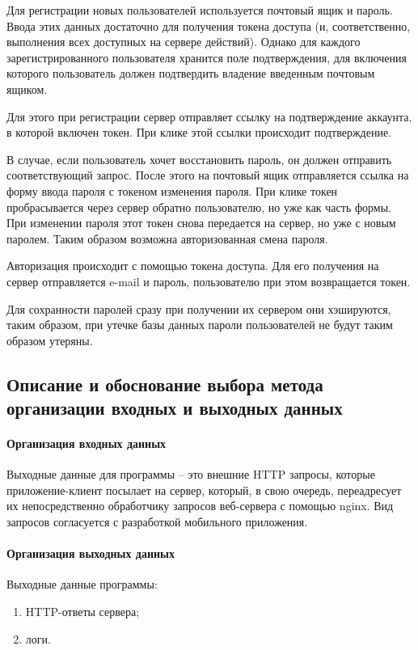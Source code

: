 \documentclass[explnote]{espd}
\begin{document}
Для регистрации новых пользователей используется почтовый ящик и пароль. Ввода этих данных достаточно для получения токена доступа (и, соответственно, выполнения всех доступных на сервере действий). Однако для каждого зарегистрированного пользователя хранится поле подтверждения, для включения которого пользователь должен подтвердить владение введенным почтовым ящиком.

Для этого при регистрации сервер отправляет ссылку на подтверждение аккаунта, в которой включен токен. При клике этой ссылки происходит подтверждение.

В случае, если пользователь хочет восстановить пароль, он должен отправить соответствующий запрос. После этого на почтовый ящик отправляется ссылка на форму ввода пароля с токеном изменения пароля. При клике токен пробрасывается через сервер обратно пользователю, но уже как часть формы. При изменении пароля этот токен снова передается на сервер, но уже с новым паролем. Таким образом возможна авторизованная смена пароля.

Авторизация происходит с помощью токена доступа. Для его получения на сервер отправляется e-mail и пароль, пользователю при этом возвращается токен.

Для сохранности паролей сразу при получении их сервером они хэшируются, таким образом, при утечке базы данных пароли пользователей не будут таким образом утеряны.

\subsection{Описание и обоснование выбора метода организации входных и выходных данных}
\paragraph{Организация входных данных}
Выходные данные для программы -- это внешние HTTP запросы, которые приложение-клиент посылает на сервер, который, в свою очередь, переадресует их непосредственно обработчику запросов веб-сервера с помощью nginx. Вид запросов согласуется с разработкой мобильного приложения.

\paragraph{Организация выходных данных}\label{paragraph:output}
Выходные данные программы:

\begin{enumerate}
\item HTTP-ответы сервера;
\item логи.
\end{enumerate}
\end{document}
